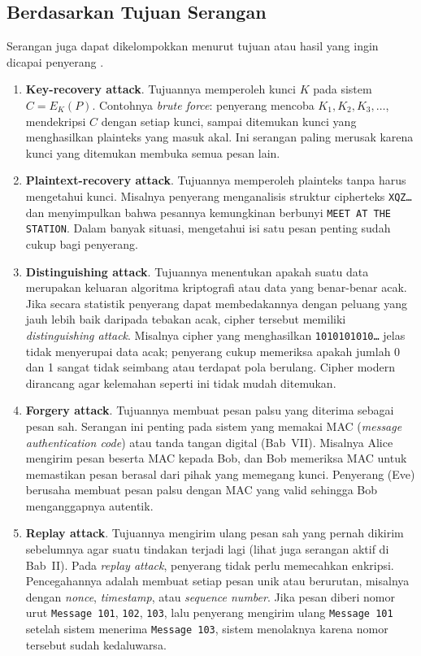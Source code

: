 \subsection{Berdasarkan Tujuan Serangan}

Serangan juga dapat dikelompokkan menurut tujuan atau hasil yang ingin dicapai penyerang \cite{munir_slides_itb}.

\begin{enumerate}
  \item \textbf{Key-recovery attack}. Tujuannya memperoleh kunci $K$ pada sistem $C = E_K(P)$. Contohnya \textit{brute force}: penyerang mencoba $K_1, K_2, K_3, \ldots$, mendekripsi $C$ dengan setiap kunci, sampai ditemukan kunci yang menghasilkan plainteks yang masuk akal. Ini serangan paling merusak karena kunci yang ditemukan membuka semua pesan lain.

  \item \textbf{Plaintext-recovery attack}. Tujuannya memperoleh plainteks tanpa harus mengetahui kunci. Misalnya penyerang menganalisis struktur cipherteks \texttt{XQZ\ldots} dan menyimpulkan bahwa pesannya kemungkinan berbunyi \texttt{MEET AT THE STATION}. Dalam banyak situasi, mengetahui isi satu pesan penting sudah cukup bagi penyerang.

  \item \textbf{Distinguishing attack}. Tujuannya menentukan apakah suatu data merupakan keluaran algoritma kriptografi atau data yang benar-benar acak. Jika secara statistik penyerang dapat membedakannya dengan peluang yang jauh lebih baik daripada tebakan acak, cipher tersebut memiliki \textit{distinguishing attack}. Misalnya cipher yang menghasilkan \texttt{1010101010\ldots} jelas tidak menyerupai data acak; penyerang cukup memeriksa apakah jumlah 0 dan 1 sangat tidak seimbang atau terdapat pola berulang. Cipher modern dirancang agar kelemahan seperti ini tidak mudah ditemukan.

  \item \textbf{Forgery attack}. Tujuannya membuat pesan palsu yang diterima sebagai pesan sah. Serangan ini penting pada sistem yang memakai MAC (\textit{message authentication code}) atau tanda tangan digital (Bab~VII). Misalnya Alice mengirim pesan beserta MAC kepada Bob, dan Bob memeriksa MAC untuk memastikan pesan berasal dari pihak yang memegang kunci. Penyerang (Eve) berusaha membuat pesan palsu dengan MAC yang valid sehingga Bob menganggapnya autentik.

  \item \textbf{Replay attack}. Tujuannya mengirim ulang pesan sah yang pernah dikirim sebelumnya agar suatu tindakan terjadi lagi (lihat juga serangan aktif di Bab~II). Pada \textit{replay attack}, penyerang tidak perlu memecahkan enkripsi. Pencegahannya adalah membuat setiap pesan unik atau berurutan, misalnya dengan \textit{nonce}, \textit{timestamp}, atau \textit{sequence number}. Jika pesan diberi nomor urut \texttt{Message 101}, \texttt{102}, \texttt{103}, lalu penyerang mengirim ulang \texttt{Message 101} setelah sistem menerima \texttt{Message 103}, sistem menolaknya karena nomor tersebut sudah kedaluwarsa.
\end{enumerate}

